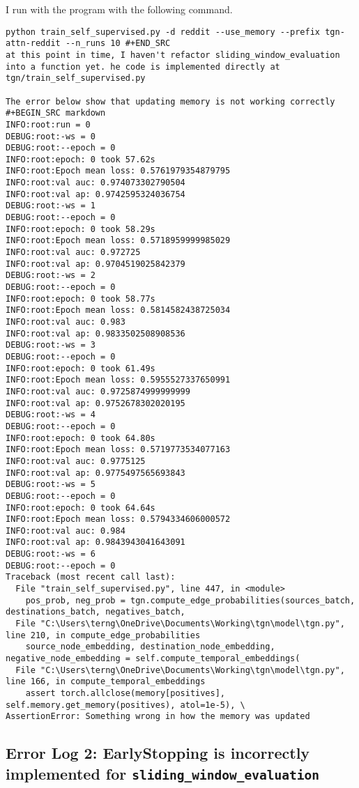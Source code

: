 \documentclass[11pt]{article}
\begin{document}
I run with the program with the following command.
\begin{verbatim}
python train_self_supervised.py -d reddit --use_memory --prefix tgn-attn-reddit --n_runs 10 #+END_SRC
at this point in time, I haven't refactor sliding_window_evaluation into a function yet. he code is implemented directly at tgn/train_self_supervised.py

The error below show that updating memory is not working correctly
#+BEGIN_SRC markdown
INFO:root:run = 0
DEBUG:root:-ws = 0
DEBUG:root:--epoch = 0
INFO:root:epoch: 0 took 57.62s
INFO:root:Epoch mean loss: 0.5761979354879795
INFO:root:val auc: 0.974073302790504
INFO:root:val ap: 0.9742595324036754
DEBUG:root:-ws = 1
DEBUG:root:--epoch = 0
INFO:root:epoch: 0 took 58.29s
INFO:root:Epoch mean loss: 0.5718959999985029
INFO:root:val auc: 0.972725
INFO:root:val ap: 0.9704519025842379
DEBUG:root:-ws = 2
DEBUG:root:--epoch = 0
INFO:root:epoch: 0 took 58.77s
INFO:root:Epoch mean loss: 0.5814582438725034
INFO:root:val auc: 0.983
INFO:root:val ap: 0.9833502508908536
DEBUG:root:-ws = 3
DEBUG:root:--epoch = 0
INFO:root:epoch: 0 took 61.49s
INFO:root:Epoch mean loss: 0.5955527337650991
INFO:root:val auc: 0.9725874999999999
INFO:root:val ap: 0.9752678302020195
DEBUG:root:-ws = 4
DEBUG:root:--epoch = 0
INFO:root:epoch: 0 took 64.80s
INFO:root:Epoch mean loss: 0.5719773534077163
INFO:root:val auc: 0.9775125
INFO:root:val ap: 0.9775497565693843
DEBUG:root:-ws = 5
DEBUG:root:--epoch = 0
INFO:root:epoch: 0 took 64.64s
INFO:root:Epoch mean loss: 0.5794334606000572
INFO:root:val auc: 0.984
INFO:root:val ap: 0.9843943041643091
DEBUG:root:-ws = 6
DEBUG:root:--epoch = 0
Traceback (most recent call last):
  File "train_self_supervised.py", line 447, in <module>
    pos_prob, neg_prob = tgn.compute_edge_probabilities(sources_batch, destinations_batch, negatives_batch,
  File "C:\Users\terng\OneDrive\Documents\Working\tgn\model\tgn.py", line 210, in compute_edge_probabilities
    source_node_embedding, destination_node_embedding, negative_node_embedding = self.compute_temporal_embeddings(
  File "C:\Users\terng\OneDrive\Documents\Working\tgn\model\tgn.py", line 166, in compute_temporal_embeddings
    assert torch.allclose(memory[positives], self.memory.get_memory(positives), atol=1e-5), \
AssertionError: Something wrong in how the memory was updated

\end{verbatim}
\subsection{Error Log 2: EarlyStopping is incorrectly implemented for \texttt{sliding\_window\_evaluation}}
\label{sec:org11f8f60}
\end{document}
